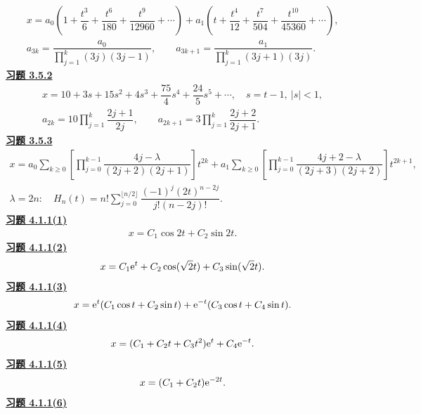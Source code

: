 \[\begin{gathered}x=a_0\left(1+\dfrac{t^3}{6}+\dfrac{t^6}{180}+\dfrac{t^9}{12960}+\cdots\right)
+a_1\left(t+\dfrac{t^4}{12}+\dfrac{t^7}{504}+\dfrac{t^{10}}{45360}+\cdots\right),\\
a_{3k}=\dfrac{a_0}{\prod_{j=1}^k(3j)(3j-1)},\qquad
 a_{3k+1}=\dfrac{a_1}{\prod_{j=1}^k(3j+1)(3j)}.\end{gathered}\]
\noindent\textbf{\hyperref[q:3.5.2]{习题 3.5.2}}
\[\begin{gathered}x=10+3s+15s^2+4s^3+\dfrac{75}{4}s^4+\dfrac{24}{5}s^5+\cdots,\quad s=t-1,\ |s|<1,\\
a_{2k}=10\prod_{j=1}^k\dfrac{2j+1}{2j},\qquad
 a_{2k+1}=3\prod_{j=1}^k\dfrac{2j+2}{2j+1}.\end{gathered}\]
\noindent\textbf{\hyperref[q:3.5.3]{习题 3.5.3}}
\[\begin{gathered}x=a_0\sum_{k\ge0}\left[\prod_{j=0}^{k-1}\dfrac{4j-\lambda}{(2j+2)(2j+1)}\right]t^{2k}
+a_1\sum_{k\ge0}\left[\prod_{j=0}^{k-1}\dfrac{4j+2-\lambda}{(2j+3)(2j+2)}\right]t^{2k+1},\\
\lambda=2n:\quad H_n(t)=n!\sum_{j=0}^{\lfloor n/2\rfloor}\dfrac{(-1)^j(2t)^{n-2j}}{j!(n-2j)!}.\end{gathered}\]
\noindent\textbf{\hyperref[q:4.1.1(1)]{习题 4.1.1(1)}}
\[\begin{gathered}x=C_1\cos2t+C_2\sin2t.\end{gathered}\]
\noindent\textbf{\hyperref[q:4.1.1(2)]{习题 4.1.1(2)}}
\[\begin{gathered}x=C_1\mathrm e^t+C_2\cos(\sqrt2t)+C_3\sin(\sqrt2t).\end{gathered}\]
\noindent\textbf{\hyperref[q:4.1.1(3)]{习题 4.1.1(3)}}
\[\begin{gathered}x=\mathrm e^t(C_1\cos t+C_2\sin t)+\mathrm e^{-t}(C_3\cos t+C_4\sin t).\end{gathered}\]
\noindent\textbf{\hyperref[q:4.1.1(4)]{习题 4.1.1(4)}}
\[\begin{gathered}x=(C_1+C_2t+C_3t^2)\mathrm e^t+C_4\mathrm e^{-t}.\end{gathered}\]
\noindent\textbf{\hyperref[q:4.1.1(5)]{习题 4.1.1(5)}}
\[\begin{gathered}x=(C_1+C_2t)\mathrm e^{-2t}.\end{gathered}\]
\noindent\textbf{\hyperref[q:4.1.1(6)]{习题 4.1.1(6)}}
